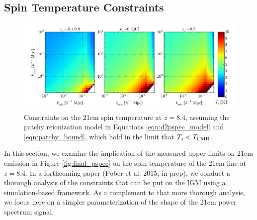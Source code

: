\documentclass[twocolumn,numberedappendix]{emulateapj} \shorttitle{New Limits on the 21 cm Power Spectrum at $z=8.4$}
\newcommand{\pobercitep}{(Pober et al. 2015, in prep)}
\begin{document}
\subsection{Spin Temperature Constraints}

\begin{figure}\centering
\includegraphics[width=2\columnwidth]{plots/ts_patchy_bound.png}
\caption{Constraints on the 21cm spin temperature at $z=8.4$, 
assuming 
the patchy reionization model in Equations
\eqref{eqn:d2pspec_model} and \eqref{eqn:patchy_bound}, which hold in the limit
that $T_{\rm s}<T_{\rm CMB}$.
} \label{fig:patchy_bound}
\end{figure}

In this section, we examine the implication of the measured upper limits
on 21cm emission in Figure \ref{fig:final_pspec} on the spin temperature
of the 21cm line at $z=8.4$.
In a forthcoming paper \pobercitep, we conduct a thorough analysis of the
constraints that can be put on the IGM using a simulation-based framework.
As a complement to that more thorough
analysis, we focus here on a simpler parameterization of the shape
of the 21cm power spectrum signal. 
\end{document}
